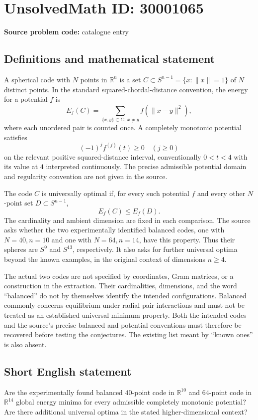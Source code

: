 \documentclass[11pt]{article}
\newcommand{\R}{\mathbb{R}}
\begin{document}
\section*{UnsolvedMath ID: 30001065}
\textbf{Source problem code:} catalogue entry
\subsection{Definitions and mathematical statement}
A spherical code with \(N\) points in \(\R^n\) is a set \(C\subset S^{n-1}=\{x:\|x\|=1\}\) of \(N\) distinct points. In the standard squared-chordal-distance convention, the energy for a potential \(f\) is
\[
E_f(C)=\sum_{\{x,y\}\subset C,\ x\ne y}f(\|x-y\|^2),
\]
where each unordered pair is counted once. A completely monotonic potential satisfies
\[
(-1)^j f^{(j)}(t)\geq0\quad(j\geq0)
\]
on the relevant positive squared-distance interval, conventionally \(0<t<4\) with its value at \(4\) interpreted continuously. The precise admissible potential domain and regularity convention are not given in the source.

The code \(C\) is universally optimal if, for every such potential \(f\) and every other \(N\)-point set \(D\subset S^{n-1}\),
\[
E_f(C)\leq E_f(D).
\]
The cardinality and ambient dimension are fixed in each comparison. The source asks whether the two experimentally identified balanced codes, one with \(N=40,n=10\) and one with \(N=64,n=14\), have this property. Thus their spheres are \(S^9\) and \(S^{13}\), respectively. It also asks for further universal optima beyond the known examples, in the original context of dimensions \(n\geq4\).

The actual two codes are not specified by coordinates, Gram matrices, or a construction in the extraction. Their cardinalities, dimensions, and the word ``balanced'' do not by themselves identify the intended configurations. Balanced commonly concerns equilibrium under radial pair interactions and must not be treated as an established universal-minimum property. Both the intended codes and the source's precise balanced and potential conventions must therefore be recovered before testing the conjectures. The existing list meant by ``known ones'' is also absent.
\subsection{Short English statement}
Are the experimentally found balanced \(40\)-point code in \(\R^{10}\) and \(64\)-point code in \(\R^{14}\) global energy minima for every admissible completely monotonic potential? Are there additional universal optima in the stated higher-dimensional context?
\end{document}
